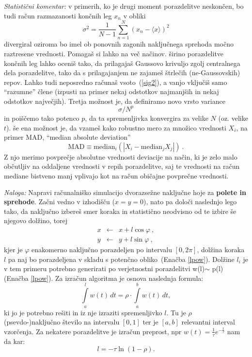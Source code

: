 \documentclass[slovene,11pt,a4paper]{article}
\def\phi{\varphi}
\begin{document}
{\sl Statistični komentar:} v primerih, ko je drugi
moment porazdelitve neskončen, bo tudi račun razmazanosti
končnih leg $x_n$ v obliki
\begin{equation}
\sigma^2 = \frac{1}{N-1} \sum_{n=1}^N \left( x_n - \langle x \rangle \right)^2
\label{sig2}
\end{equation}
divergiral oziroma bo imel ob ponovnih zagonih naključnega sprehoda
močno raztresene vrednosti.  Pomagaš si lahko na več načinov.
širino porazdelitve končnih leg lahko oceniš tako, da prilagajaš
Gaussovo krivuljo zgolj centralnega dela porazdelitve, tako da
s prilagajanjem ne zajameš štrlečih (ne-Gaussovskih) repov.
Lahko tudi neposredno računaš vsoto~(\ref{sig2}), a vanjo
vključiš samo ``razumne'' člene (izpusti na primer nekaj
odstotkov najmanjših in nekaj odstotkov največjih).
Tretja možnost je, da definiramo novo vrsto variance
\begin{equation*}
  \sigma / N^p
\end{equation*}
in poiščemo tako potenco $p$, da ta spremenljivka konvergira
za velike $N$ (oz. velike $t$).  še ena možnost je, da vzameš
kako robustno mero za množico vrednosti $X_i$, na primer MAD,
``median absolute deviation''
\begin{equation*}
  \mathrm{MAD} \equiv \mathrm{median}_i\left( | X_i - \mathrm{median}_j X_j | \right) \>.
\end{equation*}
Z njo merimo povprečje absolutne vrednosti deviacije na način,
ki je zelo malo občutljiv na oddaljene vrednosti v repih porazdelitve,
saj te vrednosti na račun mediane bistveno manj vplivajo kot na
račun običajne povprečne vrednosti.


\bigskip

{\sl Naloga:} Napravi računalniško simulacijo
dvorazsežne naključne hoje za \textbf{polete in sprehode}.  Začni vedno v izhodišču
($x=y=0$), nato pa določi naslednjo lego tako, da naključno
izbereš smer koraka in statistično neodvisno od te izbire
še njegovo dolžino, torej
\begin{eqnarray*}
x &\leftarrow& x + l \cos\phi \>, \\
y &\leftarrow& y + l \sin\phi \>,
\end{eqnarray*}
kjer je $\phi$ enakomerno naključno porazdeljen po intervalu
$[0,2\pi]$, dolžina koraka $l$ pa naj bo porazdeljena
v skladu s potenčno obliko~(Enačba \ref{lpow}). 
Dolžine $l_i$ je v tem primeru potrebno generirati po verjetnostni
porazdelitvi w(l)$\sim$ p(l) (Enačba \ref{lpow}). Za izra\v cun algoritma je osnova naslednja
formula:
\begin{equation}
\int\limits_{a}^{l} w(t)\,  dt = \rho \cdot \int\limits_{a}^{b}  w(t)\, dt,
\end{equation}
ki jo je potrebno re\v siti in iz nje izraziti spremenljivko $l$. Tu je 
$\rho$ (psevdo-)naključno število na intervalu $[0,1]$ ter je $[a,b]$ 
relevantni interval vzorčenja.
Za nekatere porazdelitve je izra\v cun preprost, npr $w(t)=\frac{1}{\tau}
e^{-\frac{t}{\tau}}$ nam da kar:
\begin{equation}
l=-\tau \ln(1-\rho).
\end{equation}
\end{document}
